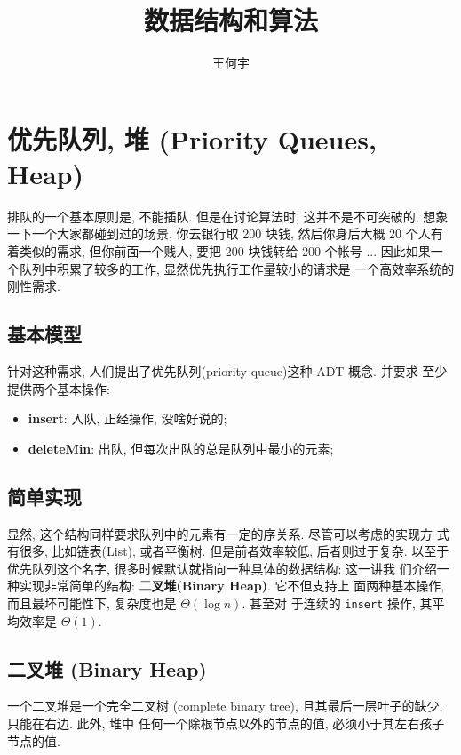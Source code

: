 \documentclass[a4paper]{ctexart}
\title{数据结构和算法}
\author{王何宇}
\date{}
\theoremstyle{definition}
\theoremstyle{definition}
\begin{document}
\maketitle
\pagestyle{empty}


\setcounter{section}{5}
\section{优先队列, 堆 (Priority Queues, Heap)}
排队的一个基本原则是, 不能插队. 但是在讨论算法时, 这并不是不可突破的.
想象一下一个大家都碰到过的场景, 你去银行取 200 块钱, 然后你身后大概 20
个人有着类似的需求, 但你前面一个贱人, 要把 200 块钱转给 200 个帐号
... 因此如果一个队列中积累了较多的工作, 显然优先执行工作量较小的请求是
一个高效率系统的刚性需求.

\subsection{基本模型}

针对这种需求, 人们提出了优先队列(priority queue)这种 ADT 概念. 并要求
至少提供两个基本操作:

\begin{itemize}
\item {\bf insert}: 入队, 正经操作, 没啥好说的;
\item {\bf deleteMin}: 出队, 但每次出队的总是队列中最小的元素; 
\end{itemize}

\subsection{简单实现}

显然, 这个结构同样要求队列中的元素有一定的序关系. 尽管可以考虑的实现方
式有很多, 比如链表(List), 或者平衡树. 但是前者效率较低, 后者则过于复杂.
以至于优先队列这个名字, 很多时候默认就指向一种具体的数据结构: 这一讲我
们介绍一种实现非常简单的结构: {\bf 二叉堆(Binary Heap)}.  它不但支持上
面两种基本操作, 而且最坏可能性下, 复杂度也是 $\Theta(\log n)$. 甚至对
于连续的 \verb|insert| 操作, 其平均效率是 $\Theta(1)$.

\subsection{二叉堆 (Binary Heap)}

 一个二叉堆是一个完全二叉树
(complete binary tree), 且其最后一层叶子的缺少, 只能在右边. 此外, 堆中
任何一个除根节点以外的节点的值, 必须小于其左右孩子节点的值.
\end{document}

